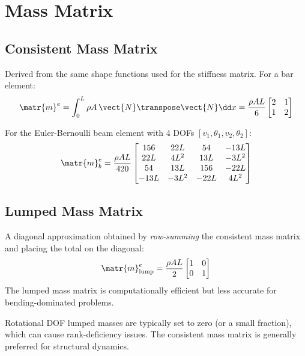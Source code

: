 \section{Mass Matrix}

\subsection{Consistent Mass Matrix}

Derived from the same shape functions used for the stiffness matrix. For a bar element:
\begin{equation}
    \matr{m}^e = \int_0^L \rho A\, \vect{N}\transpose\vect{N} \dd x
    = \frac{\rho A L}{6} \begin{bmatrix} 2 & 1 \\ 1 & 2 \end{bmatrix}
    \label{eq:consistent_mass_bar}
\end{equation}

For the Euler-Bernoulli beam element with 4 DOFs $[v_1, \theta_1, v_2, \theta_2]$:
\begin{equation}
    \matr{m}^e_b = \frac{\rho A L}{420}
    \begin{bmatrix}
        156   &  22L   &  54   & -13L  \\
        22L   &  4L^2  &  13L  & -3L^2 \\
        54    &  13L   &  156  & -22L  \\
        -13L  & -3L^2  & -22L  &  4L^2
    \end{bmatrix}
    \label{eq:consistent_mass_beam}
\end{equation}

\subsection{Lumped Mass Matrix}

A diagonal approximation obtained by \emph{row-summing} the consistent mass matrix
and placing the total on the diagonal:
\begin{equation}
    \matr{m}^e_{\text{lump}} = \frac{\rho A L}{2}
    \begin{bmatrix} 1 & 0 \\ 0 & 1 \end{bmatrix}
    \label{eq:lumped_mass}
\end{equation}
The lumped mass matrix is computationally efficient but less accurate for
bending-dominated problems.

\begin{remark}
    Rotational DOF lumped masses are typically set to zero (or a small fraction),
    which can cause rank-deficiency issues. The consistent mass matrix is generally
    preferred for structural dynamics.
\end{remark}

